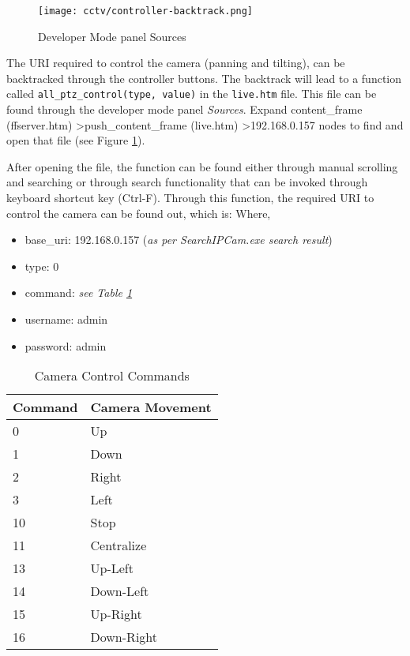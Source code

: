 \begin{figure}[h]
\caption{Developer Mode panel Sources}
\label{developer-mode-panel-sources}
\centering
\texttt{[image: cctv/controller-backtrack.png]}
\end{figure}

The URI required to control the camera (panning and tilting), can be backtracked through the controller buttons. The backtrack will lead to a function called \texttt{all\_ptz\_control(type, value)} in the \texttt{live.htm} file. This file can be found through the developer mode panel \emph{Sources}. Expand content\_frame (ffserver.htm) \textgreater push\_content\_frame (live.htm) \textgreater 192.168.0.157 nodes to find and open that file (see Figure \ref{developer-mode-panel-sources}).

After opening the file, the function can be found either through manual scrolling and searching or through search functionality that can be invoked through keyboard shortcut key (Ctrl-F). Through this function, the required URI to control the camera can be found out, which is:
\newline
{}
\newline
{}
\newline
Where,
\begin{itemize}
\item base\_uri: 192.168.0.157 (\emph{as per SearchIPCam.exe search result})
\item type: 0
\item command: \emph{see Table \ref{camera-control-commands}}
\item username: admin
\item password: admin
\end{itemize}

\begin{table}[ht]
\centering
\caption{Camera Control Commands}
\label{camera-control-commands}
\begin{tabular}{|l|l|}
\hline
Command & Camera Movement \\
\hline
0 & Up \\
1 & Down \\
2 & Right \\
3 & Left \\
10 & Stop \\
11 & Centralize \\
13 & Up-Left \\
14 & Down-Left \\
15 & Up-Right \\
16 & Down-Right\\
\hline
\end{tabular}
\end{table}

